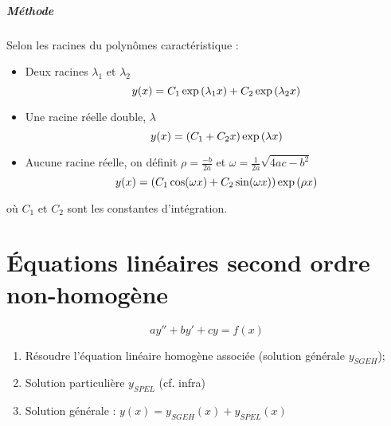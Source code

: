 \documentclass[french,oneside,twocolumn,article]{memoir} %
\DeclarePairedDelimiter{\paren}{(}{)}
\def\methode{\paragraph{Méthode}}
\begin{document}
\methode{} Selon les racines du polynômes caractéristique :
\begin{itemize}
\item Deux racines $\lambda_{1}$ et $\lambda_{2}$
  \begin{equation*}
    y(x) = C_{1} \exp{\paren*{\lambda_{1}x}} + C_{2} \exp{\paren*{\lambda_{2}x}}
  \end{equation*}
\item Une racine réelle double, $\lambda$
  \begin{equation*}
    y(x) = (C_{1} + C_{2} x) \exp{\paren*{\lambda x}}
  \end{equation*}
\item Aucune racine réelle, on définit \(\rho = \frac{-b}{2a}\) et \(\omega = \frac{1}{2a}\sqrt{4ac-b^{2}}\)
  \begin{equation*}
    y(x) = (C_{1} \cos(\omega x) + C_{2}\sin(\omega x)) \exp{\paren*{\rho x}}
  \end{equation*}
\end{itemize}
où $C_{1}$ et $C_{2}$ sont les constantes d'intégration.
\chapter{Équations linéaires second ordre non-homogène}
\begin{equation*}
  a y'' + by' + cy = f(x)
\end{equation*}
\begin{enumerate}
\item Résoudre l'équation linéaire homogène associée (solution générale $y_{SGEH}$);
\item Solution particulière $y_{SPEL}$ (cf. infra)
\item Solution générale : $y(x) = y_{SGEH}(x) + y_{SPEL}(x)$
\end{enumerate}
\end{document}
